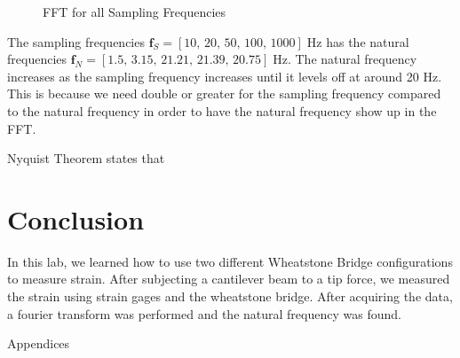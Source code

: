 \documentclass{article}
\begin{document}
\begin{figure}[H]
\begin{minipage}{.5\textwidth}
      \caption{FFT for all Sampling Frequencies}
      \label{fig:fft1000hz}
    \end{minipage}
    \label{fig:ffts}
\end{figure}
    
The sampling frequencies \(\textbf{f}_{S} = \left[10,\, 20,\, 50,\, 100,\, 1000\right]\; \text{Hz}\) has the natural frequencies \(\textbf{f}_{N} = \left[1.5,\, 3.15,\, 21.21,\, 21.39,\, 20.75\right]\; \text{Hz}\).  The natural frequency increases as the sampling frequency increases until it levels off at around 20 Hz. This is because we need double or greater for the sampling frequency compared to the natural frequency in order to have the natural frequency show up in the FFT.
\vspace{5mm}


Nyquist Theorem states that 

\section{Conclusion}
In this lab, we learned how to use two different Wheatstone Bridge configurations to measure strain.  After subjecting a cantilever beam to a tip force, we measured the strain using strain gages and the wheatstone bridge.  After acquiring the data, a fourier transform was performed and the natural frequency was found.





\newpage
\thispagestyle{empty}  %
\begin{center}
	\vspace*{\fill}
	{\Huge Appendices}
	\vspace*{\fill}
\end{center}
\end{document}
